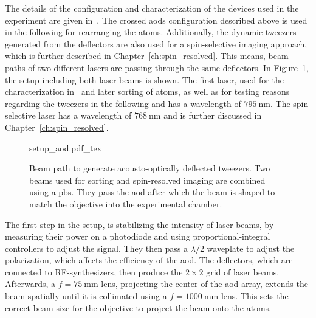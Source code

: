 \begin{figure}[ht]%
\end{figure}

The details of the configuration and characterization of the devices used in the experiment are given in~\cite{Osterholz2020}. The crossed \acp{aod} configuration described above is used in the following for rearranging the atoms. Additionally, the dynamic tweezers generated from the deflectors are also used for a spin-selective imaging approach, which is further described in Chapter~\ref{ch:spin_resolved}. This means, beam paths of two different lasers are passing through the same deflectors. In Figure~\ref{fig:setup_aod}, the setup including both laser beams is shown. The first laser, used for the characterization in~\cite{Osterholz2020} and later sorting of atoms, as well as for testing reasons regarding the tweezers in the following and has a wavelength of $\SI{795}{\nano\meter}$. The spin-selective laser has a wavelength of $\SI{768}{\nano\meter}$ and is further discussed in Chapter~\ref{ch:spin_resolved}.

\begin{figure}[t]%
\centering
{setup_aod.pdf_tex}
\caption{Beam path to generate acousto-optically deflected tweezers. Two beams used for sorting and spin-resolved imaging are combined using a \ac{pbs}. They pass the \ac{aod} after which the beam is shaped to match the objective into the experimental chamber.}%
\label{fig:setup_aod}
\end{figure}

The first step in the setup, is stabilizing the intensity of laser beams, by measuring their power on a photodiode and using proportional-integral controllers to adjust the signal. They then pass a $\lambda/2$ waveplate to adjust the polarization, which affects the efficiency of the \ac{aod}. The deflectors, which are connected to RF-synthesizers, then produce the $2\times2$ grid of laser beams. Afterwards, a $f=\SI{75}{\milli\meter}$ lens, projecting the center of the \ac{aod}-array, extends the beam spatially until it is collimated using a $f=\SI{1000}{\milli\meter}$ lens. This sets the correct beam size for the objective to project the beam onto the atoms.

